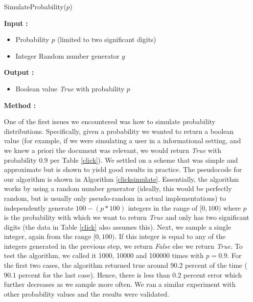 \documentclass{acm_proc_article-sp}
\begin{document}
\begin{algorithm}[t]
\caption{SimulateProbability($p$)}
\begin{spacing}{0.9}
\begin{algorithmic}

\STATE \textbf{Input :} \begin{itemize}
\item Probability $p$ (limited to two significant digits)
\item Integer Random number generator $g$  
 \end{itemize}
\STATE \textbf{Output :} \begin{itemize}
\item Boolean value \emph{True} with probability $p$
 \end{itemize}
\STATE \textbf{Method :}
\begin{enumerate}
\STATE{$range:=[0,100)$}
\ENDIF
{}
\end{enumerate}
\end{algorithmic}
\end{spacing}
\label{clicksimulate}
\end{algorithm}
One of the first issues we encountered was how to simulate probability distributions. Specifically, given a probability we wanted to return a boolean value (for example, if we were simulating a user in a informational setting, and we knew a priori the document was relevant, we would return \emph{True} with probability $0.9$ per Table \ref{click}). We settled on a scheme that was simple and approximate but is shown to yield good results in practice. The pseudocode for our algorithm is shown in Algorithm \ref{clicksimulate}. Essentially, the algorithm works by using a random number generator (ideally, this would be perfectly random, but is usually only pseudo-random in actual implementations) to independently generate $100-(p*100)$ integers in the range of $[0,100)$ where $p$ is the probability with which we want to return \emph{True} and only has two significant digits (the data in Table \ref{click} also assumes this). Next, we sample a single integer, again from the range $[0,100)$. If this integer is equal to any of the integers generated in the previous step, we return \emph{False} else we return \emph{True}. To test the algorithm, we called it 1000, 10000 and 100000 times with $p=0.9$. For the first two cases, the algorithm returned true around $90.2$ percent of the time ($90.1$ percent for the last case). Hence, there is less than $0.2$ percent error which further decreases as we sample more often. We ran a similar experiment with other probability values and the results were validated.  
\end{document}

